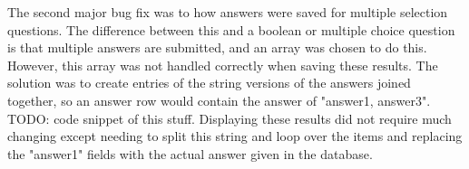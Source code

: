 The second major bug fix was to how answers were saved for multiple selection questions. The difference between this and a boolean or multiple choice question is that multiple answers are submitted, and an array was chosen to do this. However, this array was not handled correctly when saving these results. The solution was to create entries of the string versions of the answers joined together, so an answer row would contain the answer of "answer1, answer3". TODO: code snippet of this stuff. Displaying these results did not require much changing except needing to split this string and loop over the items and replacing the "answer1" fields with the actual answer given in the database.
\newpage